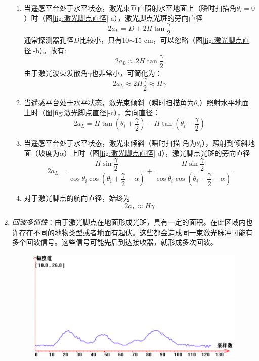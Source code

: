 \begin{enumerate}
		\begin{enumerate}
			\item 当遥感平台处于水平状态，激光束垂直照射水平地面上（瞬时扫描角$ θ_i=0 $）时（图\ref{fig:激光脚点直径}-a），激光脚点光斑的旁向直径
				\begin{equation}
				2a_L = D + 2H \tan \dfrac{\gamma}{2}
				\end{equation}
				通常探测器孔径$ D $比较小，只有10$ \sim $15 cm，可以忽略（图\ref{fig:激光脚点直径}-b）。故有:
				\begin{equation}
				2a_L \approx 2H \tan \dfrac{\gamma}{2}
				\end{equation}
				由于激光波束发散角$ γ $也非常小，可简化为：
				\begin{equation}
				2a_L \approx 2H \dfrac{\gamma}{2} \approx H \gamma
				\end{equation}
			\item 当遥感平台处于水平状态，激光束倾斜（瞬时扫描角为$ θ_i $）照射水平地面上时（图\ref{fig:激光脚点直径}-c），旁向直径：
				\begin{equation}
				2a_L = H \tan\left( \theta_i + \dfrac{\gamma}{2}\right)  - H \tan\left(\theta_i - \dfrac{\gamma}{2}\right)
				\end{equation}
			\item 当遥感平台处于水平状态，激光束倾斜（瞬时扫描 角为$ θ_i $），照射到倾斜地面（坡度为$ α $）上时（图\ref{fig:激光脚点直径}-d），激光脚点光斑的旁向直径
				\begin{equation}
				2a_L = \dfrac{H\sin\dfrac{\gamma}{2}}{\cos \theta_i \cos \left(\theta_i + \dfrac{\gamma}{2} - \alpha \right)}
				     + \dfrac{H\sin\dfrac{\gamma}{2}}{\cos \theta_i \cos \left(\theta_i - \dfrac{\gamma}{2} - \alpha \right)}
				\end{equation}
			\item 对于激光脚点的航向直径，始终为
				\begin{equation}
				2a_L \approx H \gamma
				\end{equation}
		\end{enumerate} %
	\item \textit{回波多值性}：由于激光脚点在地面形成光斑，具有一定的面积。在此区域内也许存在不同的地物类型或者地面有起伏。这些都会造成同一束激光脉冲可能有多个回波信号。这些信号可能先后到达接收器，就形成多次回波。
		\begin{figure}[htbp]
			\centering
			\includegraphics[width=0.5\linewidth]{figure/Chapter4/回波多值性}

\end{figure}
\end{enumerate}
